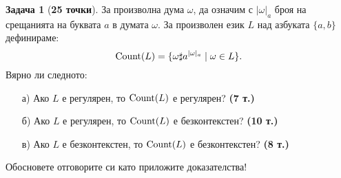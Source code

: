 \documentclass{article}
\theoremstyle{definition}
\newtheorem{problem}{Задача}
\begin{document}
\newpage

\begin{problem}[{\bf 25 точки}]
За произволна дума $\omega$, да означим с $|\omega|_a$ броя на срещанията на буквата $a$ в думата $\omega$. За произволен език $L$ над азбуката $\{a,b\}$ дефинираме:
\[\operatorname{Count}(L) = \{\omega \sharp a^{|\omega|_a} \mid \omega \in L\}.\]
Вярно ли следното:
\begin{enumerate}
    \item[а)] Ако $L$ е регулярен, то $\operatorname{Count}(L)$ е регулярен? {\bf (7 т.)}
    \item[б)] Ако $L$ е регулярен, то $\operatorname{Count}(L)$ е безконтекстен? {\bf (10 т.)}
    \item[в)] Ако $L$ е безконтекстен, то $\operatorname{Count}(L)$ е безконтекстен? {\bf (8 т.)}
\end{enumerate}
Обосновете отговорите си като приложите доказателства!
\end{problem}
\end{document}
